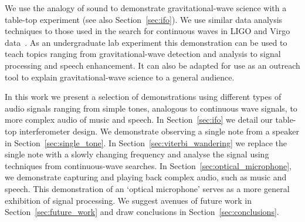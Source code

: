 \documentclass[paper-main.tex]{subfiles}
\begin{document}
We use the analogy of sound to demonstrate gravitational-wave science with a table-top experiment (see also Section~\ref{sec:ifo}). 
We use similar data analysis techniques to those used in the search for continuous waves in LIGO and Virgo data~\cite{ScoX1O2Viterbi:2019,ScoX1ViterbiO1:2017,SuvorovaEtAl:2017,SuvorovaEtAl:2017}.
As an undergraduate lab experiment this demonstration can be used to teach topics ranging from gravitational-wave detection and analysis to signal processing and speech enhancement. 
It can also be adapted for use as an outreach tool to explain gravitational-wave science to a general audience. 


In this work we present a selection of demonstrations using different types of audio signals ranging from simple tones, analogous to continuous wave signals, to more complex audio of music and speech. 
In Section~\ref{sec:ifo} we detail our table-top interferometer design. 
We demonstrate observing a single note from a speaker in Section~\ref{sec:single_tone}.
In Section~\ref{sec:viterbi_wandering} we replace the single note with a slowly changing frequency and analyse the signal using techniques from continuous-wave searches. 
In Section~\ref{sec:optical_microphone}, we demonstrate capturing and playing back complex audio, such as music and speech. 
This demonstration of an `optical microphone' serves as a more general exhibition of signal processing. 
We suggest avenues of future work in Section~\ref{sec:future_work} and draw conclusions in Section~\ref{sec:conclusions}.
\end{document}
